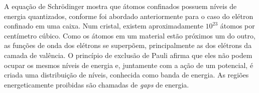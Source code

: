 \par A equação de Schrödinger mostra que átomos confinados possuem níveis de energia quantizados, conforme foi abordado anteriormente para o caso do elétron confinado em uma caixa. Num cristal, existem aproximadamente $10^{23}$ átomos por centímetro cúbico. Como os átomos em um material estão próximos um do outro, as funções de onda dos elétrons se superpõem, principalmente as dos elétrons da camada de valência. O princípio de exclusão de Pauli afirma que eles não podem ocupar os mesmos níveis de energia e, juntamente com a ação de um potencial, é criada uma distribuição de níveis, conhecida como banda de energia. As regiões energeticamente proibidas são chamadas de \textit{gaps} de energia\cite{qm_fis6}.